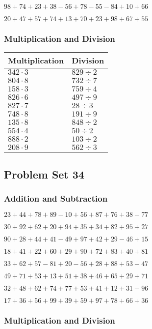 \(98+74+23+38-56+78-55-84+10+66\)

\(20+47+57+74+13+70+23+98+67+55\)

\hypertarget{multiplication-and-division-32}{%
\subsubsection{Multiplication and
Division}\label{multiplication-and-division-32}}

\begin{longtable}[]{@{}ll@{}}
\toprule
Multiplication & Division\tabularnewline
\midrule
\endhead
\(342\cdot3\) & \(829÷2\)\tabularnewline
\(804\cdot8\) & \(732÷7\)\tabularnewline
\(158\cdot3\) & \(759÷4\)\tabularnewline
\(826\cdot6\) & \(497÷9\)\tabularnewline
\(827\cdot7\) & \(28÷3\)\tabularnewline
\(748\cdot8\) & \(191÷9\)\tabularnewline
\(135\cdot8\) & \(848÷2\)\tabularnewline
\(554\cdot4\) & \(50÷2\)\tabularnewline
\(888\cdot2\) & \(103÷2\)\tabularnewline
\(208\cdot9\) & \(562÷3\)\tabularnewline
\bottomrule
\end{longtable}

\hypertarget{problem-set-34}{%
\subsection{Problem Set 34}\label{problem-set-34}}

\hypertarget{addition-and-subtraction-33}{%
\subsubsection{Addition and
Subtraction}\label{addition-and-subtraction-33}}

\(23+44+78+89-10+56+87+76+38-77\)

\(30+92+62+20+94+35+34+82+95+27\)

\(90+28+44+41-49+97+42+29-46+15\)

\(18+41+22+60+29+90+72+83+40+81\)

\(33+62+57-81+20-56+28+88+53-47\)

\(49+71+53+13+51+38+46+65+29+71\)

\(32+48+62+74+77+53+41+12+31-96\)

\(17+36+56+99+39+59+97+78+66+36\)

\hypertarget{multiplication-and-division-33}{%
\subsubsection{Multiplication and
Division}\label{multiplication-and-division-33}}

